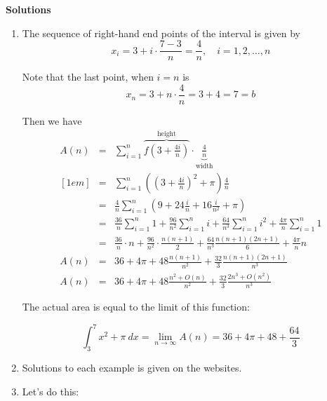 \documentclass{article}
\begin{document}
    \begin{center}
        \textbf{\Large{Solutions}}
    \end{center}
\begin{enumerate}
    \item The sequence of right-hand end points of the interval is given by
\[x_i = 3+i\cdot \frac{7-3}{n} = \frac{4}{n},\quad i = 1,2,\dots, n  \]

Note that the last point, when $i=n$ is 
\[ x_n = 3 + n\cdot \frac{4}{n} = 3 + 4 = 7 = b \]

Then we have 
\begin{eqnarray*}
A(n) &=& \sum_{i=1}^n \overbrace{f\left(3 +\frac{4i}{n}\right)}^{\text{height}}\cdot \underbrace{\frac{4}{n}}_{\text{width}} \\ [1em]
&=& \sum_{i=1}^n \left(\left(3+\frac{4i}{n}\right)^2 + \pi\right) \frac{4}{n} \\[1em]
&=& \frac{4}{n}\sum_{i=1}^n\left(9 + 24\frac{i}{n}+16\frac{i}{n^2} +\pi\right)   \\[1em]
&=& \frac{36}{n} \sum_{i=1}^n 1 + \frac{96}{n^2}\sum_{i=1}^n i + \frac{64}{n^3} \sum_{i=1}^n i^2  + \frac{4\pi}{n} \sum_{i=1}^n 1\\[1em]
&=&  \frac{36}{n} \cdot n + \frac{96}{n^2}\cdot \frac{n(n+1)}{2} + \frac{64}{n^3} \frac{n(n+1)(2n+1)}{6} + \frac{4\pi}{n}n \\[1em]
A(n)&=& 36 + 4\pi + 48 \frac{n(n+1)}{n^2} + \frac{32}{3} \frac{n(n+1)(2n+1)}{n^3} \\[1em]
A(n) &=& 36 + 4\pi + 48 \frac{n^2 + O(n)}{n^2} + \frac{32}{3} \frac{2n^3 + O(n^2)}{n^3}
\end{eqnarray*} 

The actual area is equal to the limit of this function:

\[\int_3^7 x^2 +\pi\ dx = \lim_{n\to \infty} A(n) = 36+4\pi +48+\frac{64}{3}\] 
\item Solutions to each example is given on the websites.
\item Let's do this:


\end{enumerate}
\end{document}
